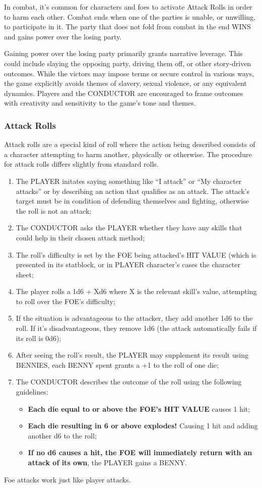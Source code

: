 In combat, it's common for characters and foes to activate Attack Rolls in order to harm each other. Combat ends when one of the parties is unable, or unwilling, to participate in it. The party that does not fold from combat in the end WINS and gains power over the losing party.

Gaining power over the losing party primarily grants narrative leverage. This could include slaying the opposing party, driving them off, or other story-driven outcomes. While the victors may impose terms or secure control in various ways, the game explicitly avoids themes of slavery, sexual violence, or any equivalent dynamics. Players and the CONDUCTOR are encouraged to frame outcomes with creativity and sensitivity to the game's tone and themes.

\subsubsection{Attack Rolls}
Attack rolls are a special kind of roll where the action being described consists of a character attempting to harm another, physically or otherwise. The procedure for attack rolls differs slightly from standard rolls.
\begin{enumerate}
    \item {The PLAYER initates saying something like ``I attack'' or ``My character attacks'' or by describing an action that qualifies as an attack. The attack's target must be in condition of defending themselves and fighting, otherwise the roll is not an attack;}
    \item {The CONDUCTOR asks the PLAYER whether they have any skills that could help in their chosen attack method;}
    \item {The roll's difficulty is set by the FOE being attacked's HIT VALUE (which is presented in its statblock, or in PLAYER character's cases the character sheet;}
    \item {The player rolls a 1d6 + Xd6 where X is the relevant skill's value, attempting to roll over the FOE's difficulty;}
    \item {If the situation is advantageous to the attacker, they add another 1d6 to the roll. If it's disadvantageous, they remove 1d6 (the attack automatically fails if its roll is 0d6);}
    \item {After seeing the roll's result, the PLAYER may supplement its result using BENNIES, each BENNY spent grants a +1 to the roll of one die;}
    \item {The CONDUCTOR describes the outcome of the roll using the following guidelines:}
    \begin{itemize}
        \item {\textbf{Each die equal to or above the FOE's HIT VALUE} causes 1 hit;}
        \item {\textbf{Each die resulting in 6 or above explodes!} Causing 1 hit and adding another d6 to the roll;}
        \item {\textbf{If no d6 causes a hit, the FOE will immediately return with an attack of its own}, the PLAYER gains a BENNY.}
    \end{itemize}
\end{enumerate}
Foe attacks work just like player attacks.

